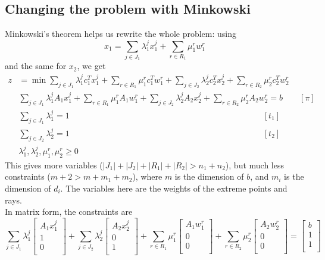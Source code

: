 \documentclass[12pt, openany]{report}
\theoremstyle{definition}
\begin{document}
\subsection{Changing the problem with Minkowski}
Minkowski's theorem helps us rewrite the whole problem: using 
\begin{equation}
	x_1 = \sum_{j\in J_1}\lambda_1^j x_1^j + \sum_{r\in R_1}\mu_1^r w_1^r 
\end{equation}
and the same for $x_2$, we get 
\begin{equation}
	\begin{aligned}
		z &= \min \sum_{j\in J_1} \lambda_1^j c_1^Tx_1^j + \sum_{r\in R_1} \mu_1^r c_1^Tw_1^r + \sum_{j\in J_2} \lambda_2^j c_2^Tx_2^j + \sum_{r\in R_2} \mu_2^r c_2^Tw_2^r\\
		& \sum_{j\in J_1} \lambda_1^j A_1x_1^j + \sum_{r\in R_1} \mu_1^r A_1w_1^r + \sum_{j\in J_2} \lambda_2^j A_2x_2^j + \sum_{r\in R_2} \mu_2^r A_2w_2^r = b \qquad [\pi]\\
		& \sum_{j\in J_1}\lambda_1^j = 1 \qquad \qquad \qquad \qquad \qquad \qquad \qquad \qquad \qquad \qquad \qquad \quad \ [t_1]\\
		& \sum_{j\in J_2}\lambda_2^j = 1 \qquad \qquad \qquad \qquad \qquad \qquad \qquad \qquad \qquad \qquad \qquad \quad \ [t_2]\\
		& \lambda_1^j, \lambda_2^j, \mu_1^r, \mu_2^r \ge 0
	\end{aligned}
\end{equation}
This gives more variables ($|J_1|+|J_2|+|R_1|+|R_2|>n_1+n_2$), but much less constraints ($m+2>m+m_1+m_2$), where $m$ is the dimension of $b$, and $m_i$ is the dimension of $d_i$. The variables here are the weights of the extreme points and rays.\\
In matrix form, the constraints are 
\begin{equation}
	\sum_{j\in J_1} \lambda_1^j \begin{bmatrix}
		A_1 x_1^j\\ 1 \\ 0 \\
	\end{bmatrix} + \sum_{j\in J_2}\lambda_2^j \begin{bmatrix}
		A_2 x_2^j\\ 0 \\ 1 \\
	\end{bmatrix} + \sum_{r\in R_1} \mu_1^r \begin{bmatrix}
		A_1 w_1^r\\ 0 \\ 0 \\
	\end{bmatrix} + \sum_{r\in R_2} \mu_2^r \begin{bmatrix}
		A_2 w_2^r\\ 0 \\ 0 \\
	\end{bmatrix} = \begin{bmatrix}
		b\\ 1 \\ 1 \\
	\end{bmatrix}
\end{equation}
\end{document}
